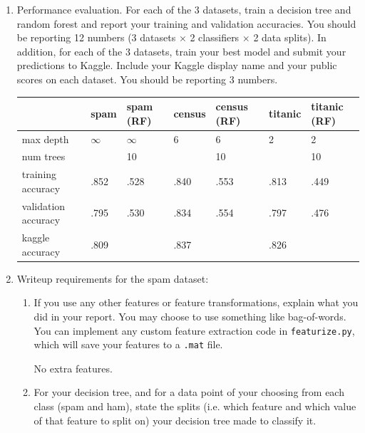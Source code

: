 \documentclass{article}
\begin{document}
\begin{enumerate}
\newpage
  \item Performance evaluation. For each of the 3 datasets, train a decision
    tree and random forest and report your training and validation
    accuracies. You should be reporting 12 numbers (3 datasets $\times$ 2
    classifiers $\times$ 2 data splits). In addition, for each of the 3
    datasets, train your best model and submit your predictions to
    Kaggle. Include your Kaggle display name and your public scores on each
    dataset. You should be reporting 3 numbers.
    \begin{mdframed}
      \begin{tabular}{l|l|l|l|l|l|l}
                              & spam     & spam (RF) & census & census (RF) & titanic & titanic (RF) \\
        \hline
        max depth             & $\infty$ & $\infty$  & 6      & 6           & 2       & 2           \\
        num trees             &          & 10        &        & 10          &         & 10          \\
        training accuracy     & .852     & .528      & .840   & .553        & .813    & .449        \\
        validation accuracy   & .795     & .530      & .834   & .554        & .797    & .476        \\
        kaggle accuracy       & .809     &           & .837   &             & .826    &             \\
      \end{tabular}

    \end{mdframed}

\newpage
    \item Writeup requirements for the spam dataset:
    \begin{enumerate}
        \item If you use any other features or feature transformations, explain what you did in your report. You may choose to use something like bag-of-words. You can implement any custom feature extraction code in \texttt{featurize.py}, which will save your features to a \texttt{.mat} file.
        \begin{mdframed}
          No extra features.
        \end{mdframed}

      \item For your decision tree, and for a data point of your choosing from
        each class (spam and ham), state the splits (i.e. which feature and
        which value of that feature to split on) your decision tree made to
        classify it.



\end{enumerate}
\end{enumerate}
\end{document}
